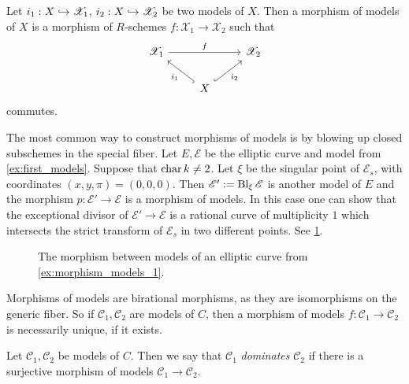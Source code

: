 \begin{definition}
	Let $i_1: X \hookrightarrow \mathscr X_1$, $i_2: X \hookrightarrow \mathscr X_2$ be two models of $X$. 
	Then a morphism of models of $X$ is a morphism of $R$-schemes $f: \mathscr X_1 \to \mathscr X_2$ such that \[
	\begin{tikzcd}
		\mathscr X_1 \ar{rr}{f} & & \mathscr X_2 \\
					& X \ar[hookrightarrow]{ul}{i_1}  \ar[hookrightarrow]{ur}[']{i_2}
	\end{tikzcd}
	\] 
	commutes.
\end{definition}

\begin{example}\label{ex:morphism_models_1}
	The most common way to construct morphisms of models is by blowing up closed subschemes in the special fiber. 
	Let $E, \mathscr E$ be the elliptic curve and model from \cref{ex:first_models}. 
	Suppose that $\operatorname{char} k \ne 2$. 
	Let $\xi$ be the singular point of $\mathscr E _s$, with coordinates $(x, y,\pi) = (0,0,0)$. 
	Then  $\mathscr E' := \operatorname{Bl}_\xi \mathscr E $ is another model of $E$ and the morphism $p:\mathscr E' \to \mathscr E $ is a morphism of models. 
	In this case one can show that the exceptional divisor of $\mathscr E' \to \mathscr E$ is a rational curve of multiplicity $1$ which intersects the strict transform of $\mathscr E _s$ in two different points. 
	See \cref{fig:morphism_models_blowup_1}.
\end{example}

\begin{figure}[h]
    \centering
    \caption{The morphism between models of an elliptic curve from \cref{ex:morphism_models_1}.}
    \label{fig:morphism_models_blowup_1}
\end{figure}

Morphisms of models are birational morphisms, as they are isomorphisms on the generic fiber. So if $\mathscr C_1, \mathscr C_2$ are models of $C$, then a morphism of models $f: \mathscr C_1 \to \mathscr C_2$ is necessarily unique, if it exists. 

\begin{definition}
	Let $\mathscr C_1, \mathscr C_2$ be models of $C$. 
	Then we say that $\mathscr C_1$ \emph{dominates} $\mathscr C_2$ if there is a surjective morphism of models $\mathscr C_1 \to \mathscr C_2$.
\end{definition}

